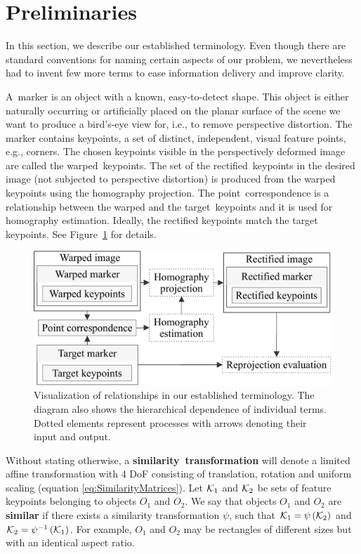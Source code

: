 \section{Preliminaries}
\label{sec:HomographyPreliminaries}

In this section, we describe our established terminology. Even though there are standard conventions for naming certain aspects of our problem, we nevertheless had to invent few more terms to ease information delivery and improve clarity.

A~marker is an object with a known, easy-to-detect shape. This object is either naturally occurring or artificially placed on the planar surface of the scene we want to produce a bird's-eye view for, i.e., to remove perspective distortion. The marker contains keypoints, a set of distinct, independent, visual feature points, e.g., corners. The chosen keypoints visible in the perspectively deformed image are called the \mbox{warped keypoints}. The set of the \mbox{rectified keypoints} in the desired image (not subjected to perspective distortion) is produced from the warped keypoints using the homography projection. The \mbox{point correspondence} is a relationship between the warped and the \mbox{target keypoints} and it is used for homography estimation. Ideally, the rectified keypoints match the target keypoints. See Figure~\ref{fig:HomographyTerminology} for details.

\begin{figure}[t]
    \centering
    \includegraphics[width=0.6\linewidth]{figures/homography/terminology.pdf}
    \caption{Visualization of relationships in our established terminology. The diagram also shows the hierarchical dependence of individual terms. Dotted elements represent processes with arrows denoting their input and output.}
    \label{fig:HomographyTerminology}
\end{figure}

Without stating otherwise, a \mbox{\textbf{similarity transformation}} will denote a limited affine transformation with $4$ DoF consisting of translation, rotation and uniform scaling (equation \eqref{eq:SimilarityMatrices}). Let $\mathcal{K}_1$ and $\mathcal{K}_2$ be sets of feature keypoints belonging to objects $O_1$ and $O_2$. We say that objects $O_1$ and $O_2$ are \mbox{\textbf{similar}} if there exists a similarity transformation $\psi$, such that $\mathcal{K}_1 = {\psi} \left( \mathcal{K}_2 \right)$ and $\mathcal{K}_2 = {\psi^{-1}} \left( \mathcal{K}_1 \right)$. For example, $O_1$ and $O_2$ may be rectangles of different sizes but with an identical aspect ratio.

